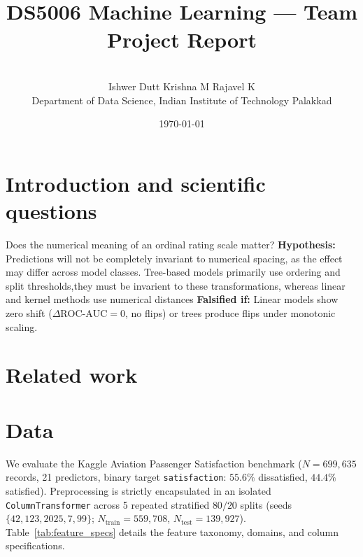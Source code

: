 \documentclass[10pt,a4paper]{article}
\title{\textbf{\projecttitle}\\[4pt]\large DS5006 Machine Learning --- Team Project Report}
\author{\teamname\\[2pt]
\small Ishwer Dutt \quad Krishna M \quad Rajavel K\\
\small Department of Data Science, Indian Institute of Technology Palakkad}
\date{\today}
\begin{document}
\maketitle

\begin{abstract}

\end{abstract}

\section{Introduction and scientific questions}

\begin{description}[leftmargin=1.2em,style=nextline]
\item[Q1.] Does the numerical meaning of an ordinal rating scale matter?
      \textbf{Hypothesis:} Predictions will not be completely invariant to numerical spacing, as the effect may differ across model classes. Tree-based models primarily use ordering and split thresholds,they must be invarient to these transformations, whereas linear and kernel methods
use numerical distances
      \textbf{Falsified if:} Linear models show zero shift ($\Delta\text{ROC-AUC} = 0$, no flips) or trees produce flips under
      monotonic scaling.
\end{description}

\section{Related work}

\section{Data}
We evaluate the Kaggle Aviation Passenger Satisfaction benchmark ($N = 699{,}635$ records, 21 predictors, binary target \texttt{satisfaction}: $55.6\%$ dissatisfied, $44.4\%$ satisfied). Preprocessing is strictly encapsulated in an isolated \texttt{Column\-Transformer} across 5 repeated stratified $80/20$ splits (seeds $\{42, 123, 2025, 7, 99\}$; $N_{\text{train}} = 559{,}708$, $N_{\text{test}} = 139{,}927$). Table~\ref{tab:feature_specs} details the feature taxonomy, domains, and column specifications.
\end{document}
